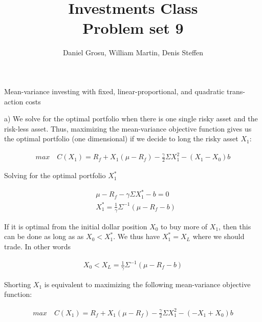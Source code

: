 \documentclass[10pt]{article}
\newenvironment{exercise}[2][Exercise]{\begin{trivlist}
  \item[\hskip \labelsep {\bfseries #1}\hskip \labelsep {\bfseries #2.}]}{\end{trivlist}}
\begin{document}
  \pagecolor{solar}
	
  \renewcommand{\qedsymbol}{\smiley}
	\title{Investments Class \\ Problem set 9}
	\author{Daniel Grosu, William Martin, Denis Steffen}
		
\maketitle

\begin{exercise}{1}{Mean-variance investing with fixed, linear-proportional, and quadratic trans- action costs}
\end{exercise}

\newpage

\begin{exercise}{2}
\end{exercise}

a) We solve for the optimal portfolio when there is one single risky asset and the risk-less asset. Thus, maximizing the mean-variance objective function gives us the optimal portfolio (one dimensional) if we decide to long the risky asset $X_1$:

\begin{align*}
	max \quad C(X_1) = R_f + X_1(\mu - R_f) - \frac{\gamma}{2} \Sigma X_1^2 - (X_1 - X_0)b
\end{align*}

Solving for the optimal portfolio $X_1^*$ 

\begin{align*}
	& \mu - R_f - \gamma \Sigma X_1^* - b = 0 \\
	& X_1^* = \frac{1}{\gamma} \Sigma^{-1} (\mu - R_f  - b)
\end{align*}

If it is optimal from the initial dollar position $X_0$ to buy more of $X_1$, then this can be done as long as as $X_0 < X_1^*$. We thus have $X_1^* = X_L$ where we should trade. In other words

\begin{align*}
	X_0 < X_L = \frac{1}{\gamma} \Sigma^{-1} (\mu - R_f  - b)
\end{align*}

Shorting $X_1$ is equivalent to maximizing the following mean-variance objective function:

\begin{align*}
	max \quad C(X_1) = R_f + X_1(\mu - R_f) - \frac{\gamma}{2} \Sigma X_1^2 - (-X_1 + X_0)b
\end{align*}
\end{document}
